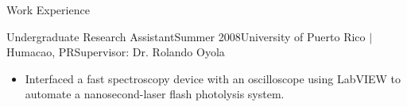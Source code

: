 \documentclass{resume} %
\begin{document}
\begin{rSection}{Work Experience}
\begin{rSubsection}{Undergraduate Research Assistant}{Summer 2008}{University of Puerto Rico $\vert$ Humacao, PR}{Supervisor: Dr. Rolando Oyola}

\item
\begin{itemize}
\item Interfaced a fast spectroscopy device with an oscilloscope using LabVIEW
  to automate a nanosecond-laser flash photolysis system.
\end{itemize}

\end{rSubsection}


\end{rSection}





\end{document}
